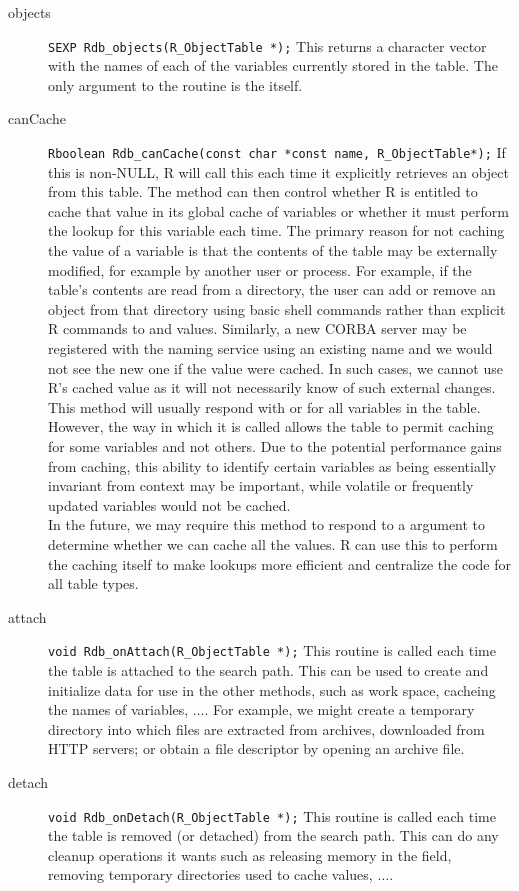 \documentclass{article}
\begin{document}
\begin{description}
\item[objects] {\small \verb+SEXP Rdb_objects(R_ObjectTable *);+ }
  This returns a character vector with the names of each of the
  variables currently stored in the table.  The only argument to the
  routine is the  itself.
\item[canCache] {\small 
\verb+Rboolean Rdb_canCache(const char *const name, R_ObjectTable*);+
} If this is non-NULL, R will call this
  each time it explicitly retrieves an object from this table.  The
  method can then control whether R is entitled to cache that value in
  its global cache of variables or whether it must perform the lookup
  for this variable each time.  The primary reason for not caching the
  value of a variable is that the contents of the table may be
  externally modified, for example by another user or process.  For
  example, if the table's contents are read from a directory, the user
  can add or remove an object from that directory using basic shell
  commands rather than explicit R commands to  and
   values. Similarly, a new CORBA server may be
  registered with the naming service using an existing name and we
  would not see the new one if the value were cached.  In such cases,
  we cannot use R's cached value as it will not necessarily know of
  such external changes.  This method will usually respond with \STrue
  or \SFalse for all variables in the table.  However, the way in
  which it is called allows the table to permit caching for some
  variables and not others.  Due to the potential performance gains
  from caching, this ability to identify certain variables as being
  essentially invariant from context may be important, while volatile
  or frequently updated variables would not be cached.  \\ In the
  future, we may require this method to respond to a \CNull{} argument
  to determine whether we can cache all the values.  R can use this to
  perform the caching itself to make lookups more efficient and
  centralize the code for all table types.
\item[attach] {\small \verb+void Rdb_onAttach(R_ObjectTable *);+ }
  This routine is called each time the table is attached to the search
  path.  This can be used to create and initialize data for use in the
  other methods, such as work space, cacheing the names of variables,
  $\ldots$.  For example, we might create a temporary directory into
  which files are extracted from archives, downloaded from HTTP
  servers; or obtain a file descriptor by opening an archive file.
\item[detach] {\small \verb+void Rdb_onDetach(R_ObjectTable *);+ }
  This routine is called each time the table is removed (or detached)
  from the search path.  This can do any cleanup operations it wants
  such as releasing memory in the  field, removing
  temporary directories used to cache values, $\ldots$.
\end{description}
\end{document}
